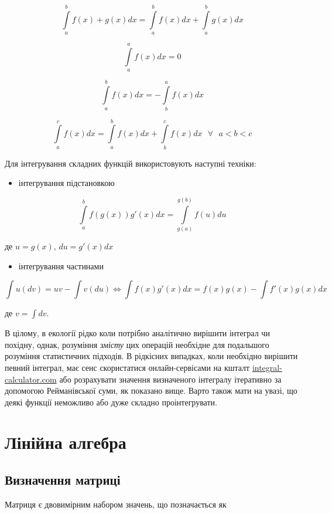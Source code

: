 \documentclass[
  11pt,
]{book}
\providecommand{\tightlist}{%
  \setlength{\itemsep}{0pt}\setlength{\parskip}{0pt}}
\begin{document}
\[\int \limits_a^b f(x) + g(x) dx = \int \limits_a^b f(x) dx + \int \limits_a^b g(x) dx\]

\[\int \limits_a^a f(x)dx = 0\]

\[\int \limits_a^b f(x)dx = -\int \limits_b^a f(x)dx\]

\[\int \limits_a^c f(x)dx = \int \limits_a^b f(x)dx + \int \limits_b^c f(x)dx \text{ } \forall \text{ } a < b < c\]

Для інтегрування складних функцій використовують наступні техніки:

\begin{itemize}
\tightlist
\item
  інтегрування підстановкою
\end{itemize}

\[\int \limits_a^b f(g(x)) g'(x)dx = \int \limits_{g(a)}^{g(b)} f(u) du\]

де \(u = g(x)\), \(du = g'(x)dx\)

\begin{itemize}
\tightlist
\item
  інтегрування частинами
\end{itemize}

\[\int u (dv) = uv - \int v (du) \iff \int f(x)g'(x)dx = f(x)g(x) - \int f'(x) g(x) dx\]

де \(v = \int dv\).

В цілому, в екології рідко коли потрібно аналітично вирішити інтеграл чи похідну, однак, розуміння \emph{змісту} цих операцій необхідне для подальшого розуміння статистичних підходів. В рідкісних випадках, коли необхідно вирішити певний інтеграл, має сенс скористатися онлайн-сервісами на кшталт \href{https://www.integral-calculator.com/}{integral-calculator.com} або розрахувати значення визначеного інтегралу ітеративно за допомогою Рейманівської суми, як показано вище. Варто також мати на увазі, що деякі функції неможливо або дуже складно проінтегрувати.

\section{Лінійна алгебра}\label{matrices}

\subsection{Визначення матриці}\label{ux432ux438ux437ux43dux430ux447ux435ux43dux43dux44f-ux43cux430ux442ux440ux438ux446ux456}

Матриця є двовимірним набором значень, що позначається як
\end{document}
